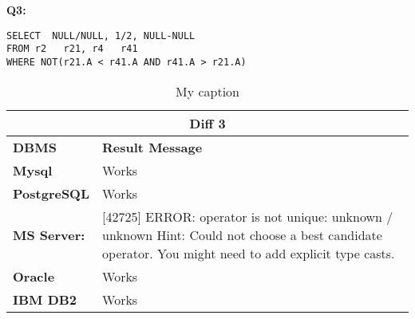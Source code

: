 \begin{mdframed}[backgroundcolor=gray!20] 
\textbf{Q3:}
\begin{lstlisting}
SELECT  NULL/NULL, 1/2, NULL-NULL
FROM r2   r21, r4   r41
WHERE NOT(r21.A < r41.A AND r41.A > r21.A)
\end{lstlisting}
\end{mdframed}

\begin{table}[h]
\centering
\caption{My caption}
\label{my-label}
\begin{tabular}{|p{2cm}|p{12cm}|}
\hline
\multicolumn{2}{|c|}{\textbf{Diff 3}}                                                                                                                                                                                         \\ \hline
\textbf{DBMS}                              & \textbf{Result Message}                                                                                                                                                          \\ \hline
{\color[HTML]{333333} \textbf{Mysql}}      & {\color[HTML]{333333} Works}                                                                                                                                                     \\ \hline
{\color[HTML]{333333} \textbf{PostgreSQL}} & {\color[HTML]{333333} Works}                                                                                                                                                     \\ \hline
{\color[HTML]{333333} \textbf{MS Server:}} & {\color[HTML]{333333} {[}42725{]} ERROR: operator is not unique: unknown / unknown Hint: Could not choose a best candidate operator. You might need to add explicit type casts.} \\ \hline
\textbf{Oracle}                            & Works                                                                                                                                                                            \\ \hline
\textbf{IBM DB2}                           & Works                                                                                                                                                                            \\ \hline
\end{tabular}
\end{table}

